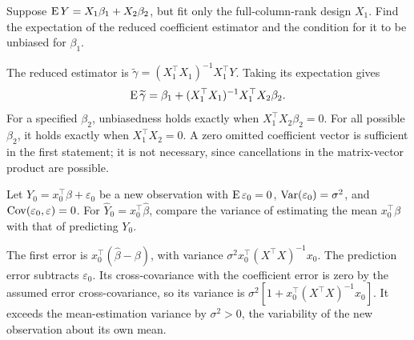 \begin{problem}
Suppose $\operatorname{E} Y=X_1\beta_1+X_2\beta_2$, but fit only the full-column-rank
design $X_1$. Find the expectation of the reduced coefficient estimator
and the condition for it to be unbiased for $\beta_1$.
\end{problem}
\begin{solution}
The reduced estimator is $\widetilde\gamma=(X_1^\top X_1)^{-1}X_1^\top Y$.
Taking its expectation gives
\[
\operatorname{E}\widetilde\gamma=\beta_1+
(X_1^\top X_1)^{-1}X_1^\top X_2\beta_2.
\]
For a specified $\beta_2$, unbiasedness holds exactly when
$X_1^\top X_2\beta_2=0$. For all possible $\beta_2$, it holds exactly
when $X_1^\top X_2=0$. A zero omitted coefficient vector is sufficient
in the first statement; it is not necessary, since cancellations in
the matrix-vector product are possible.
\end{solution}

\begin{problem}
Let $Y_0=x_0^\top\beta+\varepsilon_0$ be a new observation with
$\operatorname{E}\varepsilon_0=0$, $\operatorname{Var}(\varepsilon_0)=\sigma^2$, and
$\operatorname{Cov}(\varepsilon_0,\varepsilon)=0$. For
$\widehat Y_0=x_0^\top\widehat\beta$, compare the variance of estimating
the mean $x_0^\top\beta$ with that of predicting $Y_0$.
\end{problem}
\begin{solution}
The first error is $x_0^\top(\widehat\beta-\beta)$, with variance
$\sigma^2x_0^\top(X^\top X)^{-1}x_0$.
The prediction error subtracts $\varepsilon_0$. Its cross-covariance
with the coefficient error is zero by the assumed error cross-covariance,
so its variance is
$\sigma^2[1+x_0^\top(X^\top X)^{-1}x_0]$.
It exceeds the mean-estimation variance by $\sigma^2>0$, the variability
of the new observation about its own mean.
\end{solution}


